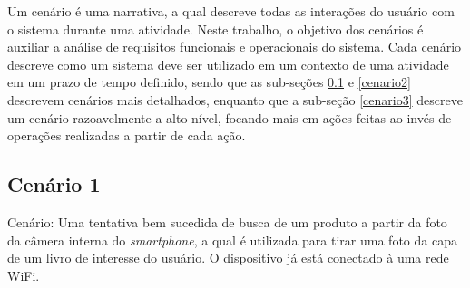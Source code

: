 

Um cenário é uma narrativa, a qual descreve todas as interações do usuário
com o sistema durante uma atividade.
Neste trabalho, o objetivo dos cenários é auxiliar a análise de
requisitos funcionais e operacionais do sistema.  Cada cenário descreve como um
sistema deve ser utilizado em um contexto de uma atividade em um prazo de 
tempo definido, sendo que as sub-seções \ref{cenario1} e \ref{cenario2}
descrevem cenários mais detalhados, enquanto que a sub-seção 
\ref{cenario3} descreve um
cenário razoavelmente a alto nível, focando mais em ações feitas ao invés
de operações realizadas a partir de cada ação.

\subsection{Cenário 1} \label{cenario1}

Cenário: Uma tentativa bem sucedida de busca de um produto a partir da
foto da câmera interna do \emph{smartphone}, a qual é utilizada para
tirar uma foto da capa de um livro de interesse do usuário.  O dispositivo
já está conectado à uma rede WiFi.

